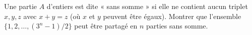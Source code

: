 Une partie $A$ d'entiers est dite « sans somme » si elle ne contient aucun triplet $x, y, z$ avec $x + y = z$ (où $x$ et $y$ peuvent être égaux). Montrer que l'ensemble $\{1, 2, \ldots, (3^n - 1)/2\}$ peut être partagé en $n$ parties sans somme.

